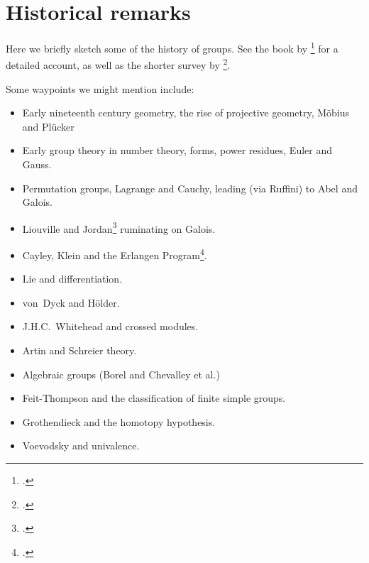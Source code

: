 \chapter{Historical remarks}
\label{ch:grouphistory}

Here we briefly sketch some of the history of groups.
See the book by \citeauthor{Wussing-genesis}\footcite{Wussing-genesis}
for a detailed account,
as well as the shorter survey by
\citeauthor{Kleiner-group-survey}\footcite{Kleiner-group-survey}.

Some waypoints we might mention include:
\begin{itemize}
\item Early nineteenth century geometry,
  the rise of projective geometry, Möbius and Plücker
\item Early group theory in number theory,
  forms, power residues, Euler and Gauss.
\item Permutation groups, Lagrange and Cauchy,
  leading (via Ruffini) to Abel and Galois.
\item Liouville and Jordan\footcite{Jordan} ruminating on Galois.
\item Cayley, Klein and the Erlangen Program\footcite{Klein-EP-de}.
\item Lie and differentiation.
\item von~Dyck and Hölder.
\item J.H.C.~Whitehead and crossed modules.
\item Artin and Schreier theory.
\item Algebraic groups (Borel and Chevalley et al.)
\item Feit-Thompson and the classification of finite simple groups.
\item Grothendieck and the homotopy hypothesis.
\item Voevodsky and univalence.
\end{itemize}

